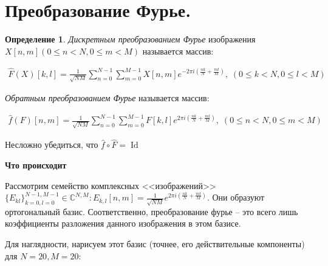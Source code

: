 \documentclass[]{book}
\theoremstyle{definition}
\newtheorem*{defn*}{Определение}
\newcommand{\LR}[1]{\left ( #1 \right )}
\begin{document}

\section*{Преобразование Фурье.}

\begin{defn*} \textit{Дискретным преобразованием Фурье} изображения $X[n, m] (0 \leqslant n < N, 0 \leqslant m < M)$ называется массив:

\begin{gather*}
\hat{F}(X)[k, l] = \frac{1}{\sqrt{NM}} \sum\limits_{n = 0}^{N - 1}\sum\limits_{m = 0}^{M - 1} X[n, m] e^{-2\pi i \LR{\frac{nk}{N} + \frac{ml}{M}}}, \;  (0 \leqslant k < N, 0 \leqslant l < M)
\end{gather*}

\textit{Обратным преобразованием Фурье} называется массив:

\begin{gather*}
\hat{f}(F)[n, m] = \frac{1}{\sqrt{NM}} \sum\limits_{n = 0}^{N - 1}\sum\limits_{m = 0}^{M - 1} F[k, l] e^{2\pi i \LR{\frac{nk}{N} + \frac{ml}{M}}}, \;  (0 \leqslant n < N, 0 \leqslant m < M)
\end{gather*}

Несложно убедиться, что $\hat{f} \circ \hat{F} = \operatorname{Id}$
\end{defn*}

\textbf{Что происходит}

Рассмотрим семейство комплексных <<изображений>> $\{E_{kl}\}_{k = 0, l = 0}^{N - 1, M - 1} \in \mathbb{C}^{N, M}: E_{k, l}[n, m] = \frac{1}{\sqrt{NM}} e^{2\pi i \LR{\frac{nk}{N} + \frac{ml}{M}}}$. Они образуют ортогональный базис. Соответственно, преобразование фурье -- это всего лишь коэффициенты разложения данного изображения в этом базисе.

Для наглядности, нарисуем этот базис (точнее, его действительные компоненты) для $N = 20, M = 20$:
\end{document}
